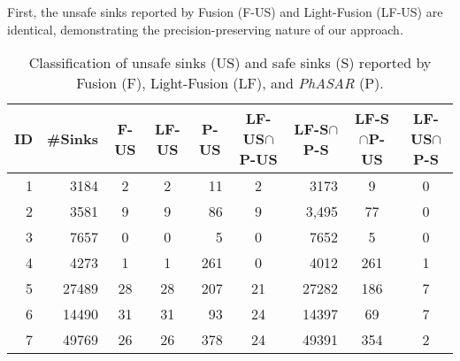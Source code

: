 First, the unsafe sinks reported by Fusion (F-US) and Light-Fusion (LF-US) are identical, demonstrating the precision-preserving nature of our approach.


\begin{table}[t] \small
\renewcommand\thetable{A.1}
\caption{Classification of unsafe sinks (US) and safe sinks (S) reported by Fusion (F), Light-Fusion (LF), and \textit{PhASAR} (P).
}
\label{table:report}
\resizebox{\columnwidth}{!} {
\begin{tabular}{r|rccr|crcc}
\hline
ID & \multicolumn{1}{c}{\#Sinks} & \multicolumn{1}{c}{F-US} & LF-US & \multicolumn{1}{c|}{P-US} & \multicolumn{1}{c}{LF-US$\cap$P-US} & \multicolumn{1}{c}{LF-S$\cap$P-S} & \multicolumn{1}{c}{LF-S$\cap$P-US} & \multicolumn{1}{c}{LF-US$\cap$P-S} \\ \hline
1  & 3184                        & 2                        & 2     & 11                        & 2                                    & 3173                               & 9                                   & 0                                   \\
2  & 3581                        & 9                        & 9     & 86                        & 9                                    & 3,495                              & 77                                  & 0                                   \\
3  & 7657                        & 0                        & 0     & 5                         & 0                                    & 7652                               & 5                                   & 0                                   \\
4  & 4273                        & 1                        & 1     & 261                       & 0                                    & 4012                               & 261                                 & 1                                   \\
5  & 27489                       & 28                       & 28    & 207                       & 21                                   & 27282                              & 186                                 & 7                                   \\
6  & 14490                       & 31                       & 31    & 93                        & 24                                   & 14397                              & 69                                  & 7                                   \\
7  & 49769                       & 26                       & 26    & 378                       & 24                                   & 49391                              & 354                                 & 2                                   \\

\end{tabular}}
\end{table}
